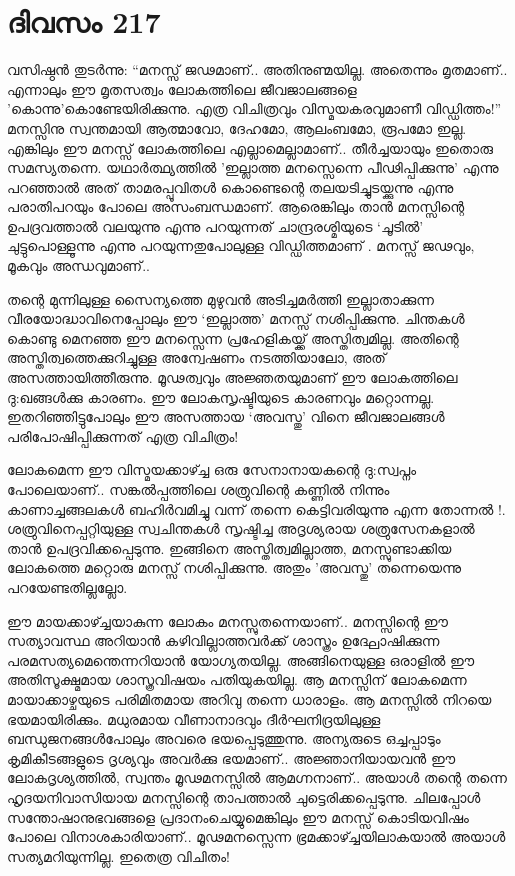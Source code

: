 \section{ദിവസം 217}


വസിഷ്ഠൻ തുടർന്നു: “മനസ്സ് ജഢമാണ്‌.. അതിനുണ്മയില്ല. അതെന്നും മൃതമാണ്‌.. എന്നാലും ഈ മൃതസത്വം ലോകത്തിലെ ജീവജാലങ്ങളെ 'കൊന്നു'കൊണ്ടേയിരിക്കുന്നു. എത്ര വിചിത്രവും വിസ്മയകരവുമാണീ വിഡ്ഡിത്തം!” മനസ്സിനു സ്വന്തമായി ആത്മാവോ, ദേഹമോ, ആലംബമോ, രൂപമോ ഇല്ല. എങ്കിലും ഈ മനസ്സ് ലോകത്തിലെ എല്ലാമെല്ലാമാണ്‌.. തീർച്ചയായും ഇതൊരു സമസ്യതന്നെ. യഥാർത്ഥ്യത്തിൽ 'ഇല്ലാത്ത മനസ്സെന്നെ പീഢിപ്പിക്കുന്നു' എന്നു പറഞ്ഞാൽ അത് താമരപ്പൂവിതൾ കൊണ്ടെന്റെ തലയടിച്ചുടയ്ക്കുന്നു എന്നു പരാതിപറയും പോലെ അസംബന്ധമാണ്. ആരെങ്കിലും താൻ മനസ്സിന്റെ ഉപദ്രവത്താൽ വലയുന്നു എന്നു പറയുന്നത് ചാന്ദ്രരശ്മിയുടെ ‘ചൂടിൽ’ ചുട്ടുപൊള്ളൂന്നു എന്നു പറയുന്നതുപോലുള്ള വിഡ്ഡിത്തമാണ്‌ . മനസ്സ് ജഢവും, മൂകവും അന്ധവുമാണ്‌..

തന്റെ മുന്നിലുള്ള സൈന്യത്തെ മുഴുവൻ അടിച്ചമർത്തി ഇല്ലാതാക്കുന്ന വീരയോദ്ധാവിനെപ്പോലും ഈ ‘ഇല്ലാത്ത’ മനസ്സ് നശിപ്പിക്കുന്നു. ചിന്തകൾ കൊണ്ടു മെനഞ്ഞ ഈ മനസ്സെന്ന പ്രഹേളികയ്ക്ക് അസ്തിത്വമില്ല. അതിന്റെ അസ്തിത്വത്തെക്കുറിച്ചുള്ള അന്വേഷണം നടത്തിയാലോ, അത് അസത്തായിത്തീരുന്നു. മൂഢത്വവും അജ്ഞതയുമാണ്‌ ഈ ലോകത്തിലെ ദു:ഖങ്ങൾക്കു കാരണം. ഈ ലോകസൃഷ്ടിയുടെ കാരണവും മറ്റൊന്നല്ല. ഇതറിഞ്ഞിട്ടുപോലും ഈ അസത്തായ ‘അവസ്തു’ വിനെ ജീവജാലങ്ങൾ പരിപോഷിപ്പിക്കുന്നത് എത്ര വിചിത്രം!

ലോകമെന്ന ഈ വിസ്മയക്കാഴ്ച്ച ഒരു സേനാനായകന്റെ ദു:സ്വപ്നം പോലെയാണ്‌.. സങ്കൽപ്പത്തിലെ ശത്രുവിന്റെ കണ്ണിൽ നിന്നും കാണാച്ചങ്ങലകൾ ബഹിര്‍വമിച്ചു  വന്ന് തന്നെ കെട്ടിവരിയുന്നു എന്ന തോന്നല്‍ !. ശത്രുവിനെപ്പറ്റിയുള്ള സ്വചിന്തകൾ സൃഷ്ടിച്ച അദൃശ്യരായ ശത്രുസേനകളാൽ താൻ ഉപദ്രവിക്കപ്പെടുന്നു. ഇങ്ങിനെ അസ്തിത്വമില്ലാത്ത, മനസ്സുണ്ടാക്കിയ ലോകത്തെ മറ്റൊരു മനസ്സ് നശിപ്പിക്കുന്നു. അതും 'അവസ്തു' തന്നെയെന്നു പറയേണ്ടതില്ലല്ലോ.

ഈ മായക്കാഴ്ച്ചയാകുന്ന ലോകം മനസ്സുതന്നെയാണ്‌.. മനസ്സിന്റെ ഈ സത്യാവസ്ഥ അറിയാൻ കഴിവില്ലാത്തവർക്ക് ശാസ്ത്രം ഉദ്ഘോഷിക്കുന്ന പരമസത്യമെന്തെന്നറിയാൻ യോഗ്യതയില്ല. അങ്ങിനെയുള്ള ഒരാളില്‍ ഈ അതിസൂക്ഷ്മമായ ശാസ്ത്രവിഷയം പതിയുകയില്ല. ആ മനസ്സിന്‌ ലോകമെന്ന മായാക്കാഴ്ചയുടെ പരിമിതമായ അറിവു തന്നെ ധാരാളം. ആ മനസ്സിൽ നിറയെ ഭയമായിരിക്കും. മധുരമായ വീണാനാദവും ദീർഘനിദ്രയിലുള്ള ബന്ധുജനങ്ങൾപോലും അവരെ ഭയപ്പെടുത്തുന്നു. അന്യരുടെ ഒച്ചപ്പാടും കൃമികീടങ്ങളുടെ ദൃശ്യവും അവർക്കു ഭയമാണ്‌.. അജ്ഞാനിയായവൻ ഈ ലോകദൃശ്യത്തിൽ, സ്വന്തം മൂഢമനസ്സിൽ ആമഗ്നനാണ്‌.. അയാൾ തന്റെ തന്നെ ഹൃദയനിവാസിയായ മനസ്സിന്റെ താപത്താൽ ചുട്ടെരിക്കപ്പെടുന്നു. ചിലപ്പോൾ സന്തോഷാനുഭവങ്ങളെ പ്രദാനംചെയ്യുമെങ്കിലും ഈ മനസ്സ് കൊടിയവിഷം പോലെ വിനാശകാരിയാണ്‌.. മൂഢമനസ്സെന്ന ഭ്രമക്കാഴ്ച്ചയിലാകയാൽ അയാൾ സത്യമറിയുന്നില്ല. ഇതെത്ര വിചിതം! 

